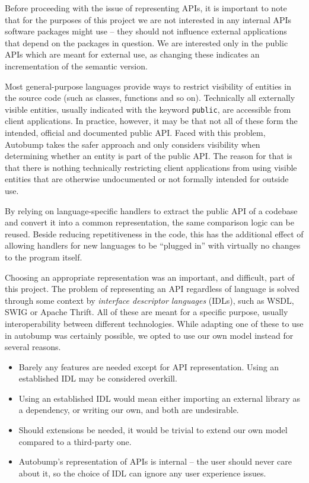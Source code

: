 \documentclass{l4proj}
\begin{document}
Before proceeding with the issue of representing APIs, it is important
to note that for the purposes of this project we are not interested in
any internal APIs software packages might use -- they should not
influence external applications that depend on the packages in question.
We are interested only in the public APIs which are meant for external
use, as changing these indicates an incrementation of the semantic version.

Most general-purpose languages provide ways to restrict visibility of
entities in the source code (such as classes, functions and so on).
Technically all externally visible entities, usually indicated with the keyword
\texttt{public}, are accessible from client applications. In practice,
however, it may be that not all of these form the intended, official
and documented public API. Faced with this problem, Autobump takes the
safer approach and only considers visibility when determining whether
an entity is part of the public API. The reason for that is that there
is nothing technically restricting client applications from using
visible entities that are otherwise undocumented or not formally
intended for outside use.

By relying on language-specific handlers to extract the public API of
a codebase and convert it into a common representation, the same
comparison logic can be reused. Beside reducing repetitiveness in the
code, this has the additional effect of allowing handlers for new
languages to be ``plugged in'' with virtually no changes to the
program itself.

Choosing an appropriate representation was an important, and
difficult, part of this project. The problem of representing an API
regardless of language is solved through some context by
\textit{interface descriptor languages} (IDLs), such as
WSDL\cite{WSDL}, SWIG\cite{SWIG} or Apache Thrift\cite{Thrift}. All of
these are meant for a specific purpose, usually interoperability between
different technologies. While adapting one of these to use in autobump
was certainly possible, we opted to use our own model instead for
several reasons.

\begin{itemize}
\item Barely any features are needed except for API representation.
Using an established IDL may be considered overkill.
\item Using an established IDL would mean either importing an external
library as a dependency, or writing our own, and both are undesirable.
\item Should extensions be needed, it would be trivial to extend our
own model compared to a third-party one.
\item Autobump's representation of APIs is internal -- the user should
never care about it, so the choice of IDL can ignore any user
experience issues.
\end{itemize}
\end{document}
